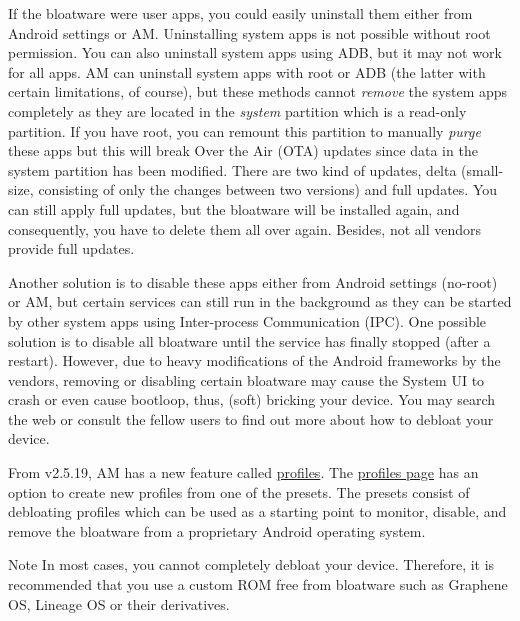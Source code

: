 If the bloatware were user apps, you could easily uninstall them either from Android settings or AM. Uninstalling system
apps is not possible without root permission. You can also uninstall system apps using ADB, but it may not work for all
apps. AM can uninstall system apps with root or ADB (the latter with certain limitations, of course), but these methods
cannot \emph{remove} the system apps completely as they are located in the \emph{system} partition which is a read-only
partition. If you have root, you can remount this partition to manually \emph{purge} these apps but this will break Over
the Air (OTA) updates since data in the system partition has been modified. There are two kind of updates, delta
(small-size, consisting of only the changes between two versions) and full updates. You can still apply full updates,
but the bloatware will be installed again, and consequently, you have to delete them all over again. Besides, not all
vendors provide full updates.

Another solution is to disable these apps either from Android settings (no-root) or AM, but certain services can still
run in the background as they can be started by other system apps using Inter-process Communication (IPC). One possible
solution is to disable all bloatware until the service has finally stopped (after a restart). However, due to heavy
modifications of the Android frameworks by the vendors, removing or disabling certain bloatware may cause the System UI
to crash or even cause bootloop, thus, (soft) bricking your device. You may search the web or consult the fellow users
to find out more about how to debloat your device.

From v2.5.19, AM has a new feature called \hyperref[sec:profile-page]{profiles}. The
\hyperref[sec:profiles-page]{profiles page} has an option to create new profiles from one of the presets. The presets
consist of debloating profiles which can be used as a starting point to monitor, disable, and remove the bloatware from
a proprietary Android operating system.

\begin{warning}{Note}
    In most cases, you cannot completely debloat your device. Therefore, it is recommended that you use a custom ROM
    free from bloatware such as Graphene OS, Lineage OS or their derivatives.
\end{warning}
